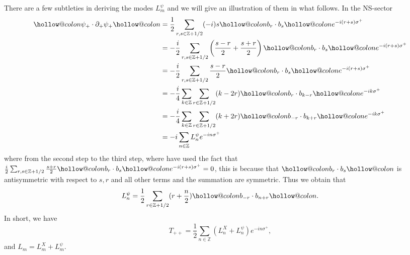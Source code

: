 \documentclass[graybox,envcountchap,sectrefs]{svmono}
\makeatletter
\newcommand{\hollowcolon}{\mathpalette\hollow@colon\relax}
\newcommand{\hollow@colon}[2]{%
  \mspace{1mu}%
  \vbox{%
    \hbox{$\m@th#1\smallcirc$}
    \nointerlineskip
    \kern.45ex
    \hbox{$\m@th#1\smallcirc$}
    \kern-.06ex
  }%
  \mspace{1mu}%
}
\newcommand{\hcolondel}[1]{%
  \mathopen{\hollowcolon}#1\mathclose{\hollowcolon}%
}
\makeatother
\begin{document}
There are a few subtleties in deriving the modes $L_{m}^{\psi}$ and we will give an illustration of them in what follows.
In the NS-sector
\begin{equation}
\begin{aligned}
\hcolondel{ \psi_{+} \cdot \partial_{+} \psi_{+}} &=\frac{1}{2} \sum_{r, s \in \mathbb{Z}+1 / 2}(-i) s\hcolondel{ b_{r} \cdot b_{s}} e^{-i(r+s) \sigma^{+}} \\ 
&=-\frac{i}{2} \sum_{r, s \in \mathbb{Z}+1 / 2}\left(\frac{s-r}{2}+\frac{s+r}{2}\right)\hcolondel{ b_{r} \cdot b_{s}} e^{-i(r+s) \sigma^+} \\ 
&=-\frac{i}{2} \sum_{r, s \in \mathbb{Z}+1 / 2} \frac{s-r}{2}\hcolondel{ b_{r} \cdot b_{s}} e^{-i(r+s) \sigma^{+}} \\ 
&=-\frac{i}{4} \sum_{k \in \mathbb{Z}} \sum_{r \in \mathbb{Z}+1 / 2}(k-2 r)\hcolondel{ b_{r} \cdot b_{k-r}} e^{-i k \sigma^{+}} \\
&=-\frac{i}{4} \sum_{k \in \mathbb{Z}} \sum_{r \in \mathbb{Z}+1 / 2}(k+2 r)\hcolondel{ b_{-r} \cdot b_{k+r}} e^{-i k \sigma^{+}} \\
&=-i\sum_{n\in \mathbb{Z}}L_n^{\psi}e^{-in\sigma^+}
\end{aligned}
\end{equation}
where from the second step to the third step, where have used the fact that 
$\frac{i}{2} \sum_{r, s \in \mathbb{Z}+1 / 2}\frac{s+r}{2}\hcolondel{ b_{r} \cdot b_{s}} e^{-i(r+s) \sigma^+}=0$, 
this is because that 
$\hcolondel{ b_{r} \cdot b_{s}}$ is antisymmetric with respect to $s,r$ and all other terms and the summation are symmetric. Thus we obtain that
\begin{equation}
L_n^{\psi}=\frac{1}{2}\sum_{r\in \mathbb{Z}+1/2}(r+\frac{n}{2})\hcolondel{b_{-r}\cdot b_{n+r}}.	
\end{equation}
In short, we have
\begin{equation}
T_{++}=\frac{1}{2}\sum_{n\in \mathbb{Z}}(L_n^X+L_n^{\psi})	e^{-in\sigma^+},
\end{equation}
and $L_m=L_{m}^{X}+L_{m}^{\psi}$.
\end{document}
